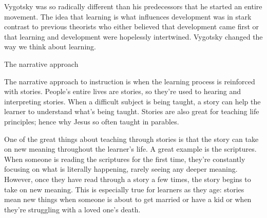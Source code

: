 \documentclass[12pt]{article}
\begin{document}
Vygotsky was so radically different than his predecessors that he started an entire movement. The idea that learning is what influences development was in stark contrast to previous theorists who either believed that development came first or that learning and development were hopelessly intertwined. Vygotsky changed the way we think about learning.

\clearpage
\begin{center}
    {\LARGE The narrative approach}
\end{center}


The narrative approach to instruction is when the learning process is reinforced with stories. People's entire lives are stories, so they're used to hearing and interpreting stories. When a difficult subject is being taught, a story can help the learner to understand what's being taught. Stories are also great for teaching life principles; hence why Jesus so often taught in parables.

One of the great things about teaching through stories is that the story can take on new meaning throughout the learner's life. A great example is the scriptures. When someone is reading the scriptures for the first time, they're constantly focusing on what is literally happening, rarely seeing any deeper meaning. However, once they have read through a story a few times, the story begins to take on new meaning. This is especially true for learners as they age: stories mean new things when someone is about to get married or have a kid or when they're struggling with a loved one's death.
\end{document}
